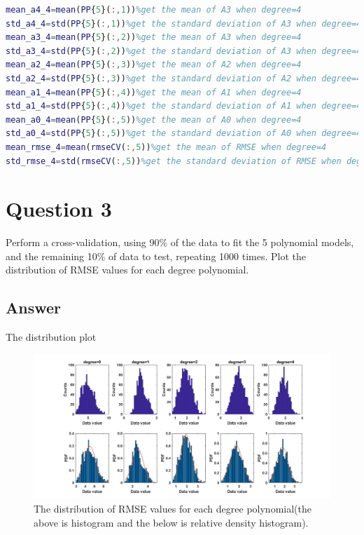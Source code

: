 \documentclass[
	12pt, %
]{fphw}
\begin{document}
\begin{lstlisting}[language=Matlab,escapeinside=``]
%degree=4
mean_a4_4=mean(PP{5}(:,1))%get the mean of A3 when degree=4
std_a4_4=std(PP{5}(:,1))%get the standard deviation of A3 when degree=4
mean_a3_4=mean(PP{5}(:,2))%get the mean of A3 when degree=4
std_a3_4=std(PP{5}(:,2))%get the standard deviation of A3 when degree=4
mean_a2_4=mean(PP{5}(:,3))%get the mean of A2 when degree=4
std_a2_4=std(PP{5}(:,3))%get the standard deviation of A2 when degree=4
mean_a1_4=mean(PP{5}(:,4))%get the mean of A1 when degree=4
std_a1_4=std(PP{5}(:,4))%get the standard deviation of A1 when degree=4
mean_a0_4=mean(PP{5}(:,5))%get the mean of A0 when degree=4
std_a0_4=std(PP{5}(:,5))%get the standard deviation of A0 when degree=4
mean_rmse_4=mean(rmseCV(:,5))%get the mean of RMSE when degree=4
std_rmse_4=std(rmseCV(:,5))%get the standard deviation of RMSE when degree=4

\end{lstlisting}




\section*{Question 3}

\begin{problem}
Perform a cross-validation, using 90\% of the data to fit the 5 polynomial models, and the remaining 10\% of
data to test, repeating 1000 times. Plot the distribution of RMSE values for each degree polynomial.
\end{problem}


\subsection*{Answer} 
 The distribution plot

\begin{figure}[htbp]
	\centering
	\includegraphics[width=1\columnwidth]{Q3.png} 
	\caption{The distribution of RMSE values for each degree polynomial(the above is histogram and the below is relative density histogram).}
\end{figure}
\end{document}
